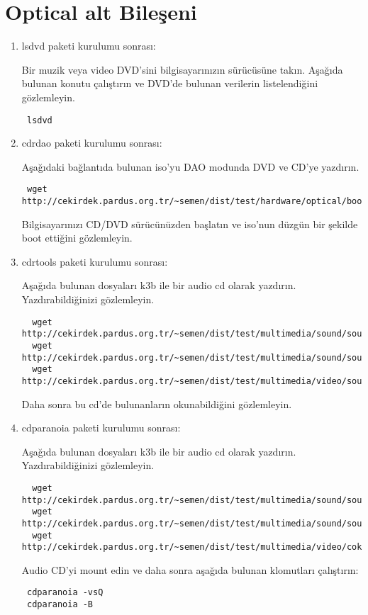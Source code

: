 \documentclass[a4paper,10pt]{article}
\begin{document}
\section{Optical alt Bileşeni}
\begin{enumerate}
\item lsdvd paketi kurulumu sonrası:

Bir muzik veya video DVD'sini bilgisayarınızın sürücüsüne takın. Aşağıda bulunan konutu çalıştırın ve DVD'de bulunan verilerin listelendiğini gözlemleyin. 
\begin{verbatim}
 lsdvd
\end{verbatim}

\item cdrdao paketi kurulumu sonrası:

Aşağıdaki bağlantıda bulunan iso'yu DAO modunda DVD ve CD'ye yazdırın. 
\begin{verbatim}
 wget http://cekirdek.pardus.org.tr/~semen/dist/test/hardware/optical/boot.iso
\end{verbatim}

Bilgisayarınızı CD/DVD sürücünüzden başlatın ve iso'nun düzgün bir şekilde boot ettiğini gözlemleyin.


 \item cdrtools paketi kurulumu sonrası:

Aşağıda bulunan dosyaları k3b ile bir audio cd olarak yazdırın. Yazdırabildiğinizi gözlemleyin.
 \begin{verbatim}
  wget http://cekirdek.pardus.org.tr/~semen/dist/test/multimedia/sound/sound/sample.wav
  wget http://cekirdek.pardus.org.tr/~semen/dist/test/multimedia/sound/sound/sample.mp3
  wget http://cekirdek.pardus.org.tr/~semen/dist/test/multimedia/video/sound/sample.ogg
 \end{verbatim}

Daha sonra bu cd'de bulunanların okunabildiğini gözlemleyin.
 \item cdparanoia paketi kurulumu sonrası:

Aşağıda bulunan dosyaları k3b ile bir audio cd olarak yazdırın. Yazdırabildiğinizi gözlemleyin.
 \begin{verbatim}
  wget http://cekirdek.pardus.org.tr/~semen/dist/test/multimedia/sound/sound/sample.wav
  wget http://cekirdek.pardus.org.tr/~semen/dist/test/multimedia/sound/sound/sample.mp3
  wget http://cekirdek.pardus.org.tr/~semen/dist/test/multimedia/video/cokluortam/linux.ogg
 \end{verbatim}

Audio CD'yi mount edin ve daha sonra aşağıda bulunan klomutları çalıştırın:
\begin{verbatim}
 cdparanoia -vsQ
 cdparanoia -B
\end{verbatim}


\end{enumerate}
\end{document}

